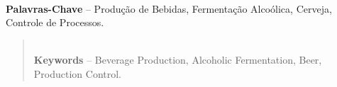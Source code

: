 \documentclass[]{politex}
\begin{document}
\capa
\falsafolhaderosto
\folhaderosto















\begin{resumo}

%
\\[3\baselineskip]
%
\textbf{Palavras-Chave} -- Produção de Bebidas, Fermentação Alcoólica, Cerveja, Controle de Processos.
\end{resumo}


\begin{abstract}

%
\\[3\baselineskip]
%
\textbf{Keywords} -- Beverage Production, Alcoholic Fermentation, Beer, Production Control.
\end{abstract}


\listadefiguras
\listadetabelas



\end{document}
